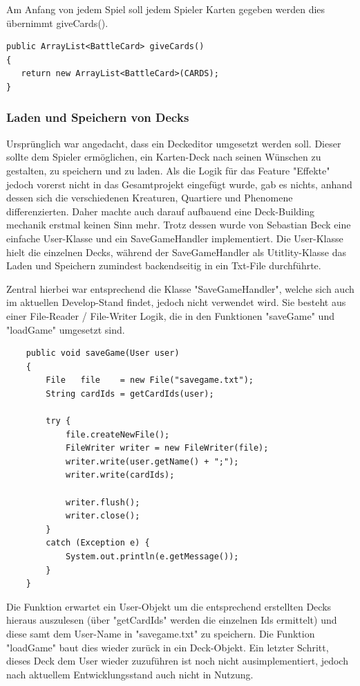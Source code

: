 Am Anfang von jedem Spiel soll jedem Spieler Karten gegeben werden dies übernimmt giveCards().

\begin{lstlisting}
public ArrayList<BattleCard> giveCards()
{
   return new ArrayList<BattleCard>(CARDS);
}
\end{lstlisting}

\subsubsection{Laden und Speichern von Decks}
Ursprünglich war angedacht, dass ein Deckeditor umgesetzt werden soll. Dieser sollte dem Spieler ermöglichen, ein Karten-Deck nach seinen Wünschen zu gestalten, zu speichern und zu laden.  Als die Logik für das Feature "Effekte" jedoch vorerst nicht in das Gesamtprojekt eingefügt wurde, gab es nichts, anhand dessen sich die verschiedenen Kreaturen, Quartiere und Phenomene differenzierten. Daher machte auch darauf aufbauend eine Deck-Building mechanik erstmal keinen Sinn mehr. Trotz dessen wurde von Sebastian Beck eine einfache User-Klasse und ein SaveGameHandler implementiert. Die User-Klasse hielt die einzelnen Decks, während der SaveGameHandler als Utitlity-Klasse das Laden und Speichern zumindest backendseitig in ein Txt-File durchführte.

Zentral hierbei war entsprechend die Klasse "SaveGameHandler", welche sich auch im aktuellen Develop-Stand findet, jedoch nicht verwendet wird. 
Sie besteht aus einer File-Reader / File-Writer Logik, die in den Funktionen "saveGame" und "loadGame" umgesetzt sind. 
\begin{lstlisting}
	public void saveGame(User user)
	{
		File   file    = new File("savegame.txt");
		String cardIds = getCardIds(user);

		try {
			file.createNewFile();
			FileWriter writer = new FileWriter(file);
			writer.write(user.getName() + ";");
			writer.write(cardIds);

			writer.flush();
			writer.close();
		}
		catch (Exception e) {
			System.out.println(e.getMessage());
		}
	}
\end{lstlisting}
Die Funktion erwartet ein User-Objekt um die entsprechend erstellten Decks hieraus auszulesen (über "getCardIds" werden die einzelnen Ids ermittelt) und diese samt dem User-Name in "savegame.txt" zu speichern.  Die Funktion "loadGame" baut dies wieder zurück in ein Deck-Objekt. Ein letzter Schritt, dieses Deck dem User wieder zuzuführen ist noch nicht ausimplementiert, jedoch nach aktuellem Entwicklungsstand auch nicht in Nutzung. 
